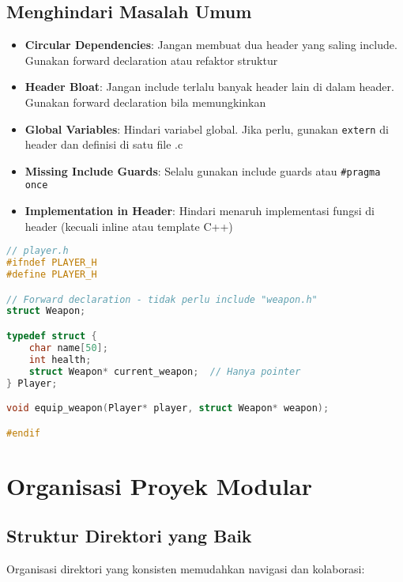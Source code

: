 \documentclass[../main.tex]{subfiles}
\begin{document}
\subsection{Menghindari Masalah Umum}

\begin{itemize}
  \item \textbf{Circular Dependencies}: Jangan membuat dua header yang saling include. Gunakan forward declaration atau refaktor struktur
  
  \item \textbf{Header Bloat}: Jangan include terlalu banyak header lain di dalam header. Gunakan forward declaration bila memungkinkan
  
  \item \textbf{Global Variables}: Hindari variabel global. Jika perlu, gunakan \texttt{extern} di header dan definisi di satu file .c
  
  \item \textbf{Missing Include Guards}: Selalu gunakan include guards atau \texttt{\#pragma once}
  
  \item \textbf{Implementation in Header}: Hindari menaruh implementasi fungsi di header (kecuali inline atau template C++)
\end{itemize}

\begin{lstlisting}[language=C, caption={Contoh forward declaration untuk menghindari circular dependency}]
// player.h
#ifndef PLAYER_H
#define PLAYER_H

// Forward declaration - tidak perlu include "weapon.h"
struct Weapon;

typedef struct {
    char name[50];
    int health;
    struct Weapon* current_weapon;  // Hanya pointer
} Player;

void equip_weapon(Player* player, struct Weapon* weapon);

#endif
\end{lstlisting}

\section{Organisasi Proyek Modular}

\subsection{Struktur Direktori yang Baik}

Organisasi direktori yang konsisten memudahkan navigasi dan kolaborasi:
\end{document}
